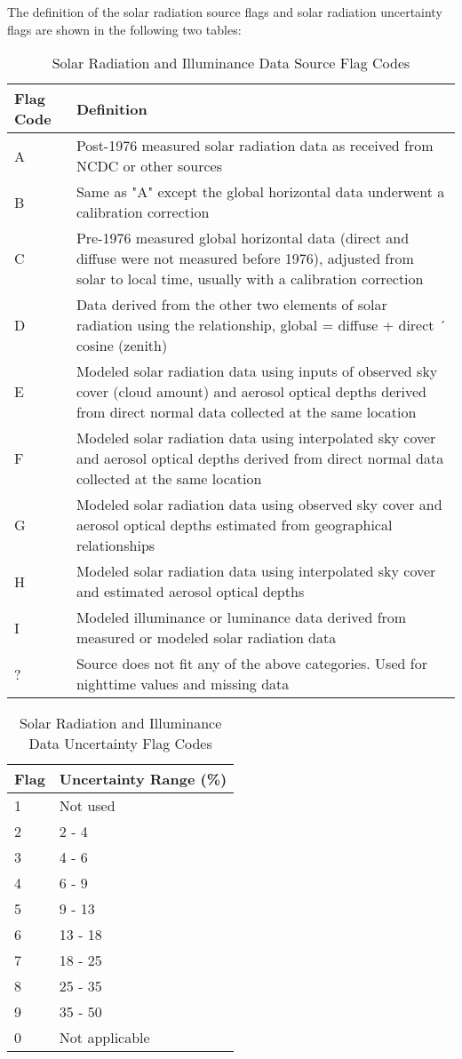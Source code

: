 The definition of the solar radiation source flags and solar radiation uncertainty flags are shown in the following two tables:

\begin{longtable}[c]{p{1.5in}p{4.5in}}
\caption{Solar Radiation and Illuminance Data Source Flag Codes \protect \label{table:solar-radiation-and-illuminance-data-source}}\\
\toprule 
Flag Code & Definition \tabularnewline \midrule
\endhead
A & Post-1976 measured solar radiation data as received from NCDC or other sources \tabularnewline
B & Same as "A" except the global horizontal data underwent a calibration correction \tabularnewline
C & Pre-1976 measured global horizontal data (direct and diffuse were not measured before 1976), adjusted from solar to local time, usually with a calibration correction \tabularnewline
D & Data derived from the other two elements of solar radiation using the relationship, global = diffuse + direct ´ cosine (zenith) \tabularnewline
E & Modeled solar radiation data using inputs of observed sky cover (cloud amount) and aerosol optical depths derived from direct normal data collected at the same location \tabularnewline
F & Modeled solar radiation data using interpolated sky cover and aerosol optical depths derived from direct normal data collected at the same location \tabularnewline
G & Modeled solar radiation data using observed sky cover and aerosol optical depths estimated from geographical relationships \tabularnewline
H & Modeled solar radiation data using interpolated sky cover and estimated aerosol optical depths \tabularnewline
I & Modeled illuminance or luminance data derived from measured or modeled solar radiation data \tabularnewline
? & Source does not fit any of the above categories. Used for nighttime values and missing data \tabularnewline
\bottomrule
\end{longtable}

\begin{longtable}[c]{@{}ll@{}}
\caption{Solar Radiation and Illuminance Data Uncertainty Flag Codes \protect \label{table:solar-radiation-and-illuminance-data}}\\
\toprule 
Flag & Uncertainty Range (\%) \tabularnewline \midrule
\endhead
1 & Not used \tabularnewline
2 & 2 - 4 \tabularnewline
3 & 4 - 6 \tabularnewline
4 & 6 - 9 \tabularnewline
5 & 9 - 13 \tabularnewline
6 & 13 - 18 \tabularnewline
7 & 18 - 25 \tabularnewline
8 & 25 - 35 \tabularnewline
9 & 35 - 50 \tabularnewline
0 & Not applicable \tabularnewline
\bottomrule
\end{longtable}

